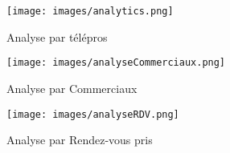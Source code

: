 \begin{figure}[H]
    \begin{minipage}[t]{0.7\textwidth}
        \centering
        \texttt{[image: images/analytics.png]}
    \end{minipage}
    \begin{minipage}[t]{0.7\textwidth}
        \caption*{Analyse par télépros}\vspace{0.3cm}
    \end{minipage}
    \vspace{1em}
    \begin{minipage}[t]{0.7\textwidth}
        \centering
        \texttt{[image: images/analyseCommerciaux.png]}
    \end{minipage}
    \begin{minipage}[t]{0.7\textwidth}
        \caption*{Analyse par Commerciaux}\vspace{0.3cm}
    \end{minipage}
    \vspace{1em}
    \begin{minipage}[t]{0.7\textwidth}
        \centering
        \texttt{[image: images/analyseRDV.png]}
    \end{minipage}
    \begin{minipage}[t]{0.7\textwidth}
        \caption*{Analyse par Rendez-vous pris}\vspace{0.3cm}
    \end{minipage}
\end{figure}